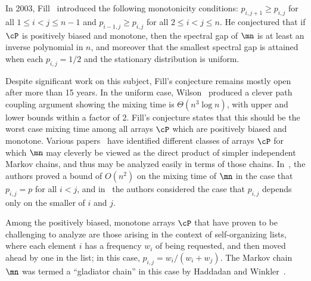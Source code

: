 \documentclass{toc}
\begin{document}
In 2003, %
Fill~\cite{F03}  %
introduced the following monotonicity 
conditions: $p_{i,j+1}\geq p_{i,j}$ for all $1\leq i<j\leq n-1$ and 
$p_{i-1,j}\geq p_{i,j}$ for all $2\leq i<j\leq n$.  He conjectured that  
if $\cP$ is positively biased and monotone, then the spectral gap of 
$\mn$ is  %
at least  %
an inverse polynomial in $n$, and moreover that the smallest 
spectral gap is attained when each $p_{i,j}=1/2$ and the stationary 
distribution is uniform. 

Despite significant work on this subject, Fill's conjecture remains 
mostly open after more than 15 years. In the uniform case, Wilson~\cite{wilson} produced a 
clever path coupling argument showing the mixing 
time is $\Theta(n^3\log n)$, with upper and lower bounds within a factor of 2. 
Fill's conjecture states that this should be the worst case mixing time among all 
arrays $\cP$ which are positively biased and monotone. 
%
%
%
%
%
Various papers~\cite{BBHM05, bmrs} have identified 
different classes of
arrays   %
$\cP$ for which $\mn$ may cleverly be viewed as 
the direct product of simpler independent Markov chains, and thus may 
be analyzed easily in terms of those chains. In~\cite{BBHM05}, the 
authors proved a bound of $O(n^2)$ on the mixing time of $\mn$ in the 
case that $p_{i,j} = p$ for all $i<j$, and in~\cite{bmrs} the authors 
considered the case that $p_{i,j}$ depends only on the smaller of $i$ 
and $j$.

Among the positively biased, monotone %
%
arrays $\cP$  %
that have proven to 
be challenging to analyze are those arising in the context of 
self-organizing lists, where each element $i$ has a frequency $w_i$ of 
being requested, and then moved ahead
by  %
one in the list; in this case, 
$p_{i,j}=w_i/(w_i+w_j)$.  The Markov chain $\mn$ was termed a 
``gladiator chain'' in this case by Haddadan and Winkler~\cite{HW16}. 
\end{document}
